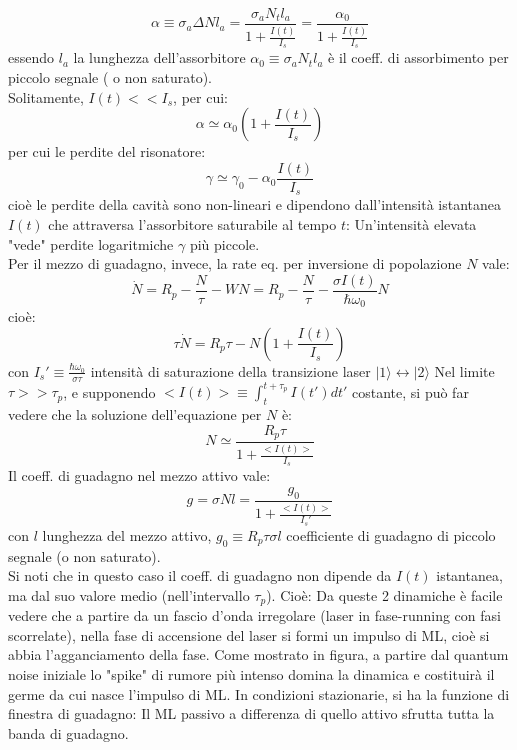 \documentclass{book}
\def \D {\Delta}
\def \s {\sigma}
\newcommand{\lve}[1]{|#1\rangle}
\theoremstyle{remark}
\begin{document}
\begin{enumerate}
\begin{equation*}
\alpha \equiv \s_a \D N l_a = \frac{\s_a N_t l_a}{1 + \frac{I(t)}{I_s}} = \frac{\alpha_0}{1 + \frac{I(t)}{I_s}}
\end{equation*}
essendo $l_a$ la lunghezza dell'assorbitore $\alpha_0 \equiv \s_a N_t l_a$ è il coeff. di assorbimento per piccolo segnale ( o non saturato).\\
Solitamente, $I(t) << I_s$, per cui:
\begin{equation*}
\alpha \simeq \alpha_0 \left(1 + \frac{I(t)}{I_s}\right)
\end{equation*}
per cui le perdite del risonatore:
\begin{equation*}
\gamma \simeq \gamma_0 - \alpha_0 \frac{I(t)}{I_s}
\end{equation*}
cioè le perdite della cavità sono non-lineari e dipendono dall'intensità istantanea $I(t)$ che attraversa l'assorbitore saturabile al tempo $t$: Un'intensità elevata "vede" perdite logaritmiche $\gamma$ più piccole.\\
Per il mezzo di guadagno, invece, la rate eq. per inversione di popolazione $N$ vale:
\begin{equation*}
\dot{N} = R_p - \frac{N}{\tau} - WN = R_p - \frac{N}{\tau} - \frac{\s I(t)}{\hbar\omega_0} N
\end{equation*}
cioè:
\begin{equation*}
\tau \dot{N} = R_p\tau - N\left(1+\frac{I(t)}{I_s}\right)
\end{equation*}
con $I_s' \equiv \frac{\hbar\omega_0}{\s \tau}$ intensità di saturazione della transizione laser $\lve{1} \leftrightarrow \lve{2}$
Nel limite $\tau >> \tau_p$, e supponendo $<I(t)> \equiv \int_t^{t+\tau_p} I(t') dt'$ costante, si può far vedere che la soluzione dell'equazione per $N$ è:
\begin{equation*}
N \simeq \frac{R_p\tau}{1 + \frac{<I(t)>}{I_s}}
\end{equation*}
Il coeff. di guadagno nel mezzo attivo vale:
\begin{equation*}
g = \s N l = \frac{g_0}{1 + \frac{<I(t)>}{I_s'}}
\end{equation*}
con $l$ lunghezza del mezzo attivo, $g_0 \equiv R_p \tau \s l$ coefficiente di guadagno di piccolo segnale (o non saturato).\\
Si noti che in questo caso il coeff. di guadagno non dipende da $I(t)$ istantanea, ma dal suo valore medio (nell'intervallo $\tau_p$). Cioè:
Da queste 2 dinamiche è facile vedere che a partire da un fascio d'onda irregolare (laser in fase-running con fasi scorrelate), nella fase di accensione del laser si formi un impulso di ML, cioè si abbia l'agganciamento della fase.
Come mostrato in figura, a partire dal quantum noise iniziale lo "spike" di rumore più intenso domina la dinamica e costituirà il germe da cui nasce l'impulso di ML. In condizioni stazionarie, si ha la funzione di finestra di guadagno:
Il ML passivo a differenza di quello attivo sfrutta tutta la banda di guadagno.


\end{enumerate}
\end{document}
